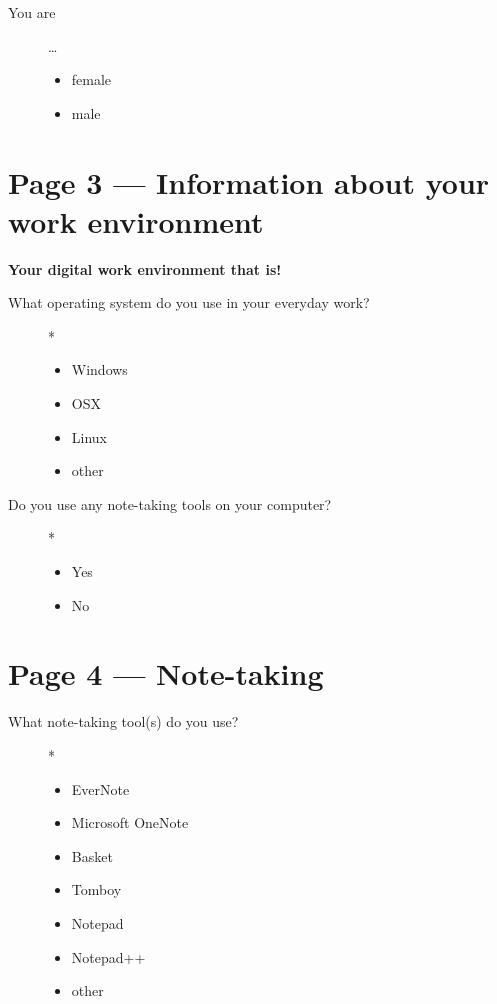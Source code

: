 \begin{description}
 \item[You are] \dots

\begin{itemize}[$\circ$]
\item female
\item male
\end{itemize}
\end{description}

\section*{ Page 3 --- Information about your work environment}

\textbf{Your digital work environment that is!}

\begin{description}
 \item[What operating system do you use in your everyday work?] *

\begin{itemize}[$\circ$]
\item Windows
\item OSX
\item Linux
\item other 
\end{itemize}
\end{description}

\begin{description}
 \item[Do you use any note-taking tools on your computer?] *

\begin{itemize}[$\circ$]
\item Yes
\item No
\end{itemize}
\end{description}

\section*{Page 4 --- Note-taking}

\begin{description}
 \item[What note-taking tool(s) do you use?] *

\begin{itemize}[$\square$]
\item EverNote
\item Microsoft OneNote
\item Basket
\item Tomboy
\item Notepad
\item Notepad++
\item other
\end{itemize}
\end{description}

